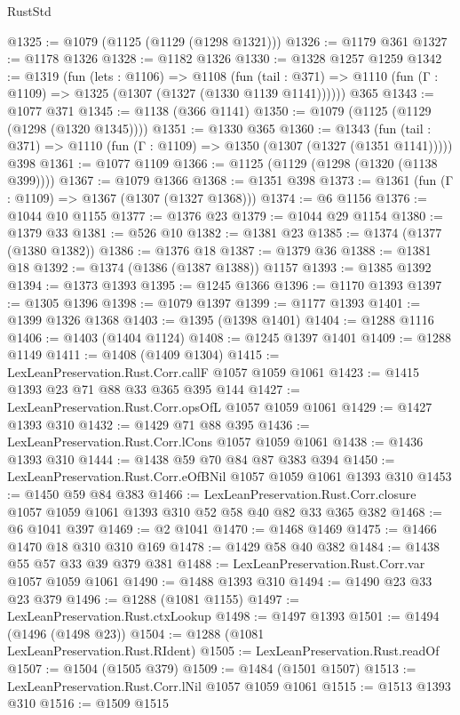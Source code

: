 \begin{lexlean}{RustStd}
\begin{coremodule}
@1325 := @1079 (@1125 (@1129 (@1298 @1321)))
@1326 := @1179 @361
@1327 := @1178 @1326
@1328 := @1182 @1326
@1330 := @1328 @1257 @1259
@1342 := @1319
    (fun (lets : @1106) =>
    @1108
      (fun (tail : @371) => @1110 (fun (Γ : @1109) => @1325 (@1307 (@1327 (@1330 @1139 @1141))))))
    @365
@1343 := @1077 @371
@1345 := @1138 (@366 @1141)
@1350 := @1079 (@1125 (@1129 (@1298 (@1320 @1345))))
@1351 := @1330 @365
@1360 := @1343
    (fun (tail : @371) => @1110 (fun (Γ : @1109) => @1350 (@1307 (@1327 (@1351 @1141)))))
    @398
@1361 := @1077 @1109
@1366 := @1125 (@1129 (@1298 (@1320 (@1138 @399))))
@1367 := @1079 @1366
@1368 := @1351 @398
@1373 := @1361 (fun (Γ : @1109) => @1367 (@1307 (@1327 @1368)))
@1374 := @6 @1156
@1376 := @1044 @10 @1155
@1377 := @1376 @23
@1379 := @1044 @29 @1154
@1380 := @1379 @33
@1381 := @526 @10
@1382 := @1381 @23
@1385 := @1374 (@1377 (@1380 @1382))
@1386 := @1376 @18
@1387 := @1379 @36
@1388 := @1381 @18
@1392 := @1374 (@1386 (@1387 @1388)) @1157
@1393 := @1385 @1392
@1394 := @1373 @1393
@1395 := @1245 @1366
@1396 := @1170 @1393
@1397 := @1305 @1396
@1398 := @1079 @1397
@1399 := @1177 @1393
@1401 := @1399 @1326 @1368
@1403 := @1395 (@1398 @1401)
@1404 := @1288 @1116
@1406 := @1403 (@1404 @1124)
@1408 := @1245 @1397 @1401
@1409 := @1288 @1149
@1411 := @1408 (@1409 @1304)
@1415 := LexLeanPreservation.Rust.Corr.callF @1057 @1059 @1061
@1423 := @1415 @1393 @23 @71 @88 @33 @365 @395 @144
@1427 := LexLeanPreservation.Rust.Corr.opsOfL @1057 @1059 @1061
@1429 := @1427 @1393 @310
@1432 := @1429 @71 @88 @395
@1436 := LexLeanPreservation.Rust.Corr.lCons @1057 @1059 @1061
@1438 := @1436 @1393 @310
@1444 := @1438 @59 @70 @84 @87 @383 @394
@1450 := LexLeanPreservation.Rust.Corr.eOfBNil @1057 @1059 @1061 @1393 @310
@1453 := @1450 @59 @84 @383
@1466 := LexLeanPreservation.Rust.Corr.closure
    @1057
    @1059
    @1061
    @1393
    @310
    @52
    @58
    @40
    @82
    @33
    @365
    @382
@1468 := @6 @1041 @397
@1469 := @2 @1041
@1470 := @1468 @1469
@1475 := @1466 @1470 @18 @310 @310 @169
@1478 := @1429 @58 @40 @382
@1484 := @1438 @55 @57 @33 @39 @379 @381
@1488 := LexLeanPreservation.Rust.Corr.var @1057 @1059 @1061
@1490 := @1488 @1393 @310
@1494 := @1490 @23 @33 @23 @379
@1496 := @1288 (@1081 @1155)
@1497 := LexLeanPreservation.Rust.ctxLookup
@1498 := @1497 @1393
@1501 := @1494 (@1496 (@1498 @23))
@1504 := @1288 (@1081 LexLeanPreservation.Rust.RIdent)
@1505 := LexLeanPreservation.Rust.readOf
@1507 := @1504 (@1505 @379)
@1509 := @1484 (@1501 @1507)
@1513 := LexLeanPreservation.Rust.Corr.lNil @1057 @1059 @1061
@1515 := @1513 @1393 @310
@1516 := @1509 @1515

\end{coremodule}
\end{lexlean}
